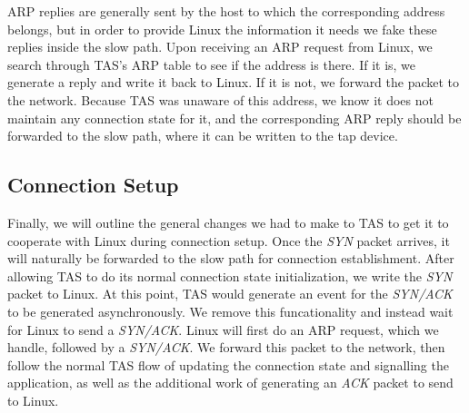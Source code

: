 ARP replies are generally sent by the host to which the corresponding address
belongs, but in order to provide Linux the information it needs we fake these 
replies inside the slow path. Upon receiving an ARP request from Linux, we 
search through TAS's ARP table to see if the address is there. If it is, 
we generate a reply and write it back to Linux. If it is not, we forward the 
packet to the network. Because TAS was unaware of this address, we know
it does not maintain any connection state for it, and the corresponding ARP 
reply should be forwarded to the slow path, where it can be written to the tap
device. 

\subsection{Connection Setup}

Finally, we will outline the general changes we had to make to TAS to get
it to cooperate with Linux during connection setup. Once the \textit{SYN} packet arrives,
 it will naturally be forwarded to the slow path for
connection establishment. After allowing TAS to do its normal connection 
state initialization, we write the \textit{SYN} packet to Linux. At this point, TAS
would generate an event for the \textit{SYN/ACK} to be generated asynchronously. We remove
this funcationality and instead wait for Linux to send a \textit{SYN/ACK}. Linux will 
first do an ARP request, which we handle, followed by a \textit{SYN/ACK}. We forward this
packet to the network, then follow the normal TAS flow of updating the 
connection state and signalling the application, as well as the additional work 
of generating an \textit{ACK} packet to send to Linux. 


